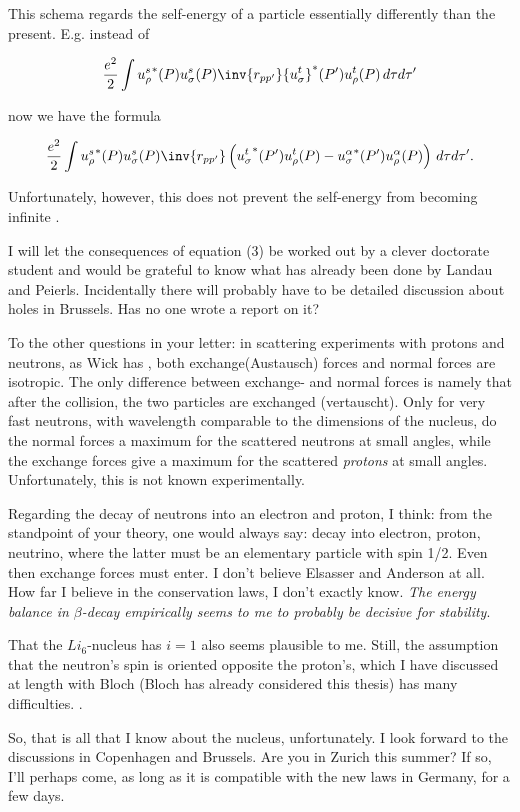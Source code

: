 \documentclass{article}
\newcommand{\uequ}[1]{
\begin{align*}
#1
\end{align*}
}
\begin{document}
This schema regards the self-energy of a particle essentially differently than the present. E.g. instead of
\uequ{
\frac{e^2}{2}\int {u^s_\rho}^*(P) u^s_\sigma(P)
    \inv{r_{pp'}} {u^t_\sigma}^*(P')u^t_\rho(P)\,d\tau d\tau'
}
now we have the formula
\uequ{
\frac{e^2}{2}\int {u^s_\rho}^*(P) u^s_\sigma(P)\inv{r_{pp'}}\left(
 {u^t_\sigma}^*(P')u^t_\rho(P) - 
 {u^\alpha_\sigma}^*(P') u^\alpha_\rho(P)\right)\,d\tau d\tau'.
}
Unfortunately, however, this does not prevent the self-energy from becoming infinite .

I will let the consequences of equation (3) be worked out by a clever doctorate student and would be grateful to know what has already been done by Landau and Peierls. Incidentally there will probably have to be detailed discussion about holes in Brussels. Has no one wrote a report on it?

To the other questions in your letter: in scattering experiments with protons and neutrons, as Wick has , both exchange(Austausch) forces and normal forces are isotropic. The only difference between exchange- and normal forces is namely that after the collision, the two particles are exchanged (vertauscht). Only for very fast neutrons, with wavelength comparable to the dimensions of the nucleus, do the normal forces a maximum for the scattered neutrons at small angles, while the exchange forces give a maximum for the scattered \textit{protons} at small angles. Unfortunately, this is not known experimentally.

Regarding the decay of neutrons into an electron and proton, I think: from the standpoint of your theory, one would always say: decay into electron, proton, neutrino, where the latter must be an elementary particle with spin 1/2. Even then exchange forces must enter. I don't believe Elsasser and Anderson at all. How far I believe in the conservation laws, I don't exactly know. \textit{The energy balance in $\beta$-decay empirically seems to me to probably be decisive for stability}.

That the $Li_6$-nucleus has $i=1$ also seems plausible to me. Still, the assumption that the neutron's spin is oriented opposite the proton's, which I have discussed at length with Bloch (Bloch has already considered this thesis) has many difficulties. .

So, that is all that I know about the nucleus, unfortunately. I look forward to the discussions in Copenhagen and Brussels. Are you in Zurich this summer? If so, I'll perhaps come, as long as it is compatible with the new laws in Germany, for a few days.
\end{document}
